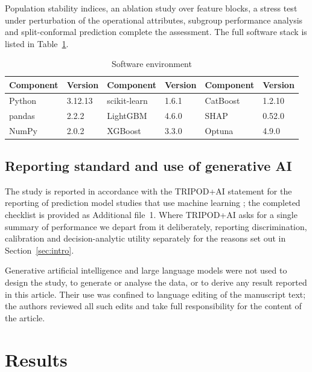 \documentclass[sn-vancouver,Numbered]{sn-jnl}
\begin{document}
Population stability indices, an ablation study over feature blocks, a stress test under perturbation of the operational attributes, subgroup performance analysis \cite{hardt_equality_2016} and split-conformal prediction \cite{vovk_algorithmic_2005,angelopoulos_conformal_2023} complete the assessment. The full software stack is listed in Table~\ref{tab:software}.

\begin{table}[h]
\caption{Software environment}\label{tab:software}
\begin{tabular}{llllll}
\toprule
Component & Version & Component & Version & Component & Version \\
\midrule
Python & 3.12.13 & scikit-learn & 1.6.1 & CatBoost & 1.2.10 \\
pandas & 2.2.2 & LightGBM & 4.6.0 & SHAP & 0.52.0 \\
NumPy & 2.0.2 & XGBoost & 3.3.0 & Optuna & 4.9.0 \\
\bottomrule
\end{tabular}
\end{table}

\subsection{Reporting standard and use of generative AI}

The study is reported in accordance with the TRIPOD+AI statement for the reporting of prediction model studies that use machine learning \cite{collins_tripod_2024}; the completed checklist is provided as Additional file~1. Where TRIPOD+AI asks for a single summary of performance we depart from it deliberately, reporting discrimination, calibration and decision-analytic utility separately for the reasons set out in Section~\ref{sec:intro}.

Generative artificial intelligence and large language models were not used to design the study, to generate or analyse the data, or to derive any result reported in this article. Their use was confined to language editing of the manuscript text; the authors reviewed all such edits and take full responsibility for the content of the article.

\section{Results}\label{sec:results}
\end{document}
